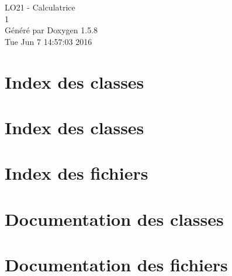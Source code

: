 \documentclass[a4paper]{book}
\begin{document}
\begin{titlepage}
\vspace*{7cm}
\begin{center}
{\Large LO21 - Calculatrice \\[1ex]\large 1 }\\
\vspace*{1cm}
{\large Généré par Doxygen 1.5.8}\\
\vspace*{0.5cm}
{\small Tue Jun 7 14:57:03 2016}\\
\end{center}
\end{titlepage}
\clearemptydoublepage
{}
\tableofcontents
\clearemptydoublepage
{}
\chapter{Index des classes}

\chapter{Index des classes}

\chapter{Index des fichiers}

\chapter{Documentation des classes}
















\chapter{Documentation des fichiers}


\printindex
\end{document}
